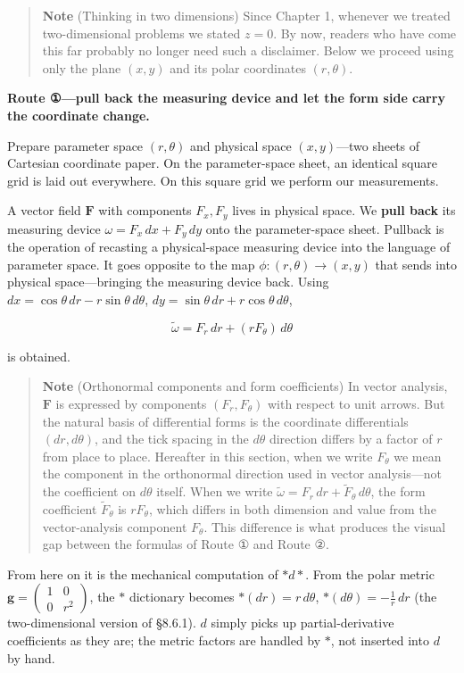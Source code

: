 \begin{quote}
\textbf{Note} (Thinking in two dimensions) Since Chapter 1, whenever we
treated two-dimensional problems we stated \(z=0\). By now, readers who
have come this far probably no longer need such a disclaimer. Below we
proceed using only the plane \((x,y)\) and its polar coordinates
\((r,\theta)\).
\end{quote}

\textbf{Route ①—pull back the measuring device and let the form side carry the coordinate change.}

Prepare parameter space \((r,\theta)\) and physical space
\((x,y)\)---two sheets of Cartesian coordinate paper. On the
parameter-space sheet, an identical square grid is laid out everywhere.
On this square grid we perform our measurements.

A vector field \(\mathbf{F}\) with components \(F_x,F_y\) lives in
physical space. We \textbf{pull back} its measuring device
\(\omega = F_x\,dx + F_y\,dy\) onto the parameter-space sheet. Pullback
is the operation of recasting a physical-space measuring device into the
language of parameter space. It goes opposite to the map
\(\phi: (r,\theta) \to (x,y)\) that sends into physical space---bringing
the measuring device back. Using
\(dx = \cos\theta\,dr - r\sin\theta\,d\theta\),
\(dy = \sin\theta\,dr + r\cos\theta\,d\theta\),

\[\tilde{\omega} = F_r\,dr + (r F_\theta)\,d\theta\]

is obtained.

\begin{quote}
\textbf{Note} (Orthonormal components and form coefficients) In vector
analysis, \(\mathbf{F}\) is expressed by components \((F_r, F_\theta)\)
with respect to unit arrows. But the natural basis of differential forms
is the coordinate differentials \((dr, d\theta)\), and the tick spacing
in the \(d\theta\) direction differs by a factor of \(r\) from place to
place. Hereafter in this section, when we write \(F_\theta\) we mean the
component in the orthonormal direction used in vector analysis---not the
coefficient on \(d\theta\) itself. When we write
\(\tilde{\omega} = F_r\,dr + \tilde{F}_\theta\,d\theta\), the form
coefficient \(\tilde{F}_\theta\) is \(r F_\theta\), which differs in
both dimension and value from the vector-analysis component
\(F_\theta\). This difference is what produces the visual gap between
the formulas of Route ① and Route ②.
\end{quote}

From here on it is the mechanical computation of \(\ast d\ast\). From
the polar metric
\(\mathbf{g} = \begin{pmatrix} 1 & 0 \\ 0 & r^2 \end{pmatrix}\), the
\(\ast\) dictionary becomes \(\ast(dr) = r\,d\theta\),
\(\ast(d\theta) = -\frac{1}{r}\,dr\) (the two-dimensional version of
§8.6.1). \(d\) simply picks up partial-derivative coefficients as they
are; the metric factors are handled by \(\ast\), not inserted into \(d\)
by hand.

